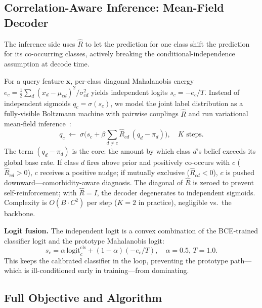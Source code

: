 \documentclass[conference]{IEEEtran}
\theoremstyle{definition}
\newcommand{\Rhat}{\widehat{R}}
\begin{document}
\subsection{Correlation-Aware Inference: Mean-Field Decoder}
\label{sec:decoder}

The inference side uses $\Rhat$ to let the prediction for one class shift the prediction for its co-occurring classes, actively breaking the conditional-independence assumption at decode time.

For a query feature $\mathbf{x}$, per-class diagonal Mahalanobis energy $e_c{=}\tfrac12\sum_d (x_d-\mu_{cd})^{2}/\sigma_{cd}^{2}$ yields independent logits $s_c{=}{-}e_c/T$. Instead of independent sigmoids $q_c{=}\sigma(s_c)$, we model the joint label distribution as a fully-visible Boltzmann machine with pairwise couplings $\Rhat$ and run variational mean-field inference~\cite{wainwright2008variational}:
\begin{equation}
q_c\;\leftarrow\;\sigma\!\Big(s_c+\beta\sum_{d\neq c}\Rhat_{cd}\,(q_d-\pi_d)\Big),\quad K\text{ steps.}
\label{eq:meanfield}
\end{equation}
The term $(q_d-\pi_d)$ is the core: the amount by which class $d$'s belief exceeds its global base rate. If class $d$ fires above prior and positively co-occurs with $c$ ($\Rhat_{cd}{>}0$), $c$ receives a positive nudge; if mutually exclusive ($\Rhat_{cd}{<}0$), $c$ is pushed downward---comorbidity-aware diagnosis. The diagonal of $\Rhat$ is zeroed to prevent self-reinforcement; with $\Rhat{=}I$, the decoder degenerates to independent sigmoids. Complexity is $O(B{\cdot}C^{2})$ per step ($K{=}2$ in practice), negligible vs.\ the backbone.

\noindent\textbf{Logit fusion.} The independent logit is a convex combination of the BCE-trained classifier logit and the prototype Mahalanobis logit:
\begin{equation}
s_c=\alpha\,\mathrm{logit}_c^{\mathrm{cls}}+(1-\alpha)(-e_c/T),\quad \alpha{=}0.5,\,T{=}1.0.
\label{eq:fusion}
\end{equation}
This keeps the calibrated classifier in the loop, preventing the prototype path---which is ill-conditioned early in training---from dominating.

\subsection{Full Objective and Algorithm}
\label{sec:objective}
\end{document}
